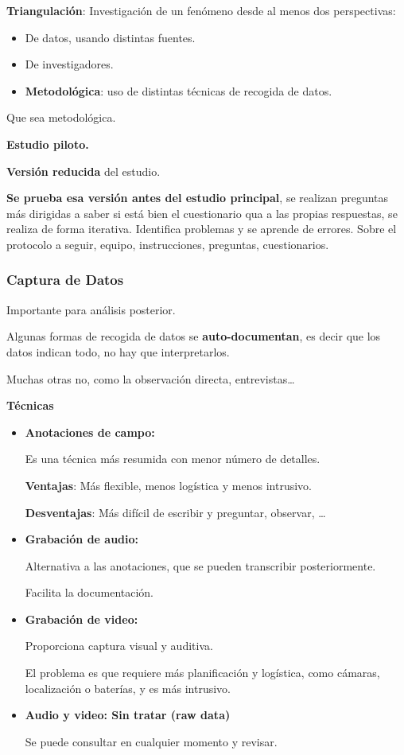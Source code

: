 \documentclass[12pt]{report} %
\begin{document}
\textbf{Triangulación}: Investigación de un fenómeno desde al menos dos
perspectivas:

\begin{itemize}
\item
  De datos, usando distintas fuentes.
\item
  De investigadores.
\item
  \textbf{Metodológica}: uso de distintas técnicas de recogida de datos.
\end{itemize}

Que sea metodológica.

\textbf{Estudio piloto.}

\textbf{Versión reducida} del estudio.

\textbf{Se prueba esa versión antes del estudio principal}, se realizan
preguntas más dirigidas a saber si está bien el cuestionario qua a las
propias respuestas, se realiza de forma iterativa. Identifica problemas
y se aprende de errores. Sobre el protocolo a seguir, equipo,
instrucciones, preguntas, cuestionarios.

\hypertarget{captura-de-datos}{%
\subsubsection{Captura de Datos}\label{captura-de-datos}}

Importante para análisis posterior.

Algunas formas de recogida de datos se \textbf{auto-documentan}, es
decir que los datos indican todo, no hay que interpretarlos.

Muchas otras no, como la observación directa, entrevistas\ldots{}

\textbf{Técnicas}

\begin{itemize}
\item
  \textbf{Anotaciones de campo:}

  Es una técnica más resumida con menor número de detalles.

  \textbf{Ventajas}: Más flexible, menos logística y menos intrusivo.

  \textbf{Desventajas}: Más difícil de escribir y preguntar, observar,
  \ldots{}
\item
  \textbf{Grabación de audio:}

  Alternativa a las anotaciones, que se pueden transcribir
  posteriormente.

  Facilita la documentación.
\item
  \textbf{Grabación de video:}

  Proporciona captura visual y auditiva.

  El problema es que requiere más planificación y logística, como
  cámaras, localización o baterías, y es más intrusivo.
\item
  \textbf{Audio y video: Sin tratar (raw data)}

  Se puede consultar en cualquier momento y revisar.
\end{itemize}
\end{document}
